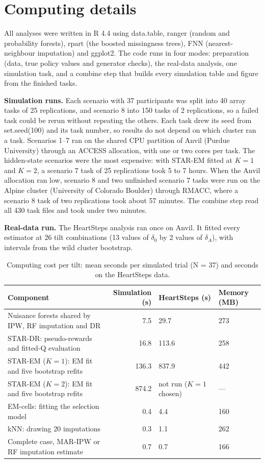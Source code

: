 \documentclass[12pt]{article}
\begin{document}
\appendix

\section{Computing details}

All analyses were written in R 4.4 using data.table, ranger (random and probability forests), rpart (the boosted missingness trees), FNN (nearest-neighbour imputation) and ggplot2. The code runs in four modes: preparation (data, true policy values and generator checks), the real-data analysis, one simulation task, and a combine step that builds every simulation table and figure from the finished tasks.

\textbf{Simulation runs.} Each scenario with 37 participants was split into 40 array tasks of 25 replications, and scenario 8 into 150 tasks of 2 replications, so a failed task could be rerun without repeating the others. Each task drew its seed from set.seed(100) and its task number, so results do not depend on which cluster ran a task. Scenarios 1--7 ran on the shared CPU partition of Anvil (Purdue University) through an ACCESS allocation, with one or two cores per task. The hidden-state scenarios were the most expensive: with STAR-EM fitted at $K=1$ and $K=2$, a scenario 7 task of 25 replications took 5 to 7 hours. When the Anvil allocation ran low, scenario 8 and two unfinished scenario 7 tasks were run on the Alpine cluster (University of Colorado Boulder) through RMACC, where a scenario 8 task of two replications took about 57 minutes. The combine step read all 430 task files and took under two minutes.

\textbf{Real-data run.} The HeartSteps analysis ran once on Anvil. It fitted every estimator at 26 tilt combinations (13 values of $\delta_0$ by 2 values of $\delta_A$), with intervals from the wild cluster bootstrap.

\begin{table}[H]\centering\small
\caption{Computing cost per tilt: mean seconds per simulated trial (N = 37) and seconds on the HeartSteps data.}
\begin{tabular}{p{}rp{}p{}}
\toprule
\textbf{Component} & \textbf{Simulation (s)} & \textbf{HeartSteps (s)} & \textbf{Memory (MB)} \\
\midrule
Nuisance forests shared by IPW, RF imputation and DR & 7.5 & 29.7 & 273 \\
STAR-DR: pseudo-rewards and fitted-Q evaluation & 16.8 & 113.6 & 258 \\
STAR-EM ($K=1$): EM fit and five bootstrap refits & 136.3 & 837.9 & 442 \\
STAR-EM ($K=2$): EM fit and five bootstrap refits & 874.2 & not run ($K=1$ chosen) & --- \\
EM-cells: fitting the selection model & 0.4 & 4.4 & 160 \\
kNN: drawing 20 imputations & 0.3 & 1.1 & 262 \\
Complete case, MAR-IPW or RF imputation estimate & 0.7 & 0.7 & 166 \\
\bottomrule
\end{tabular}
\end{table}
\end{document}
